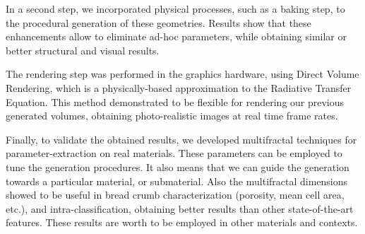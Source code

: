 \documentclass[spanish,a4paper,oneside,10pt,openright]{book}
\begin{document}
In a second step, we incorporated physical processes, such as a baking step, to the procedural generation of these geometries.
Results show that these enhancements allow to eliminate ad-hoc parameters, while obtaining similar or better structural and visual results.

The rendering step was performed in the graphics hardware, using Direct Volume Rendering, which is a physically-based approximation to the Radiative Transfer Equation.
This method demonstrated to be flexible for rendering our previous generated volumes, obtaining photo-realistic images at real time frame rates.

Finally, to validate the obtained results, we developed multifractal techniques for parameter-extraction on real materials.
These parameters can be employed to tune the generation procedures.
It also means that we can guide the generation towards a particular material, or submaterial.
Also the multifractal dimensions showed to be useful in bread crumb characterization (porosity, mean cell area, etc.), and intra-classification, obtaining better results than other state-of-the-art features.
These results are worth to be employed in other materials and contexts.

\phantom{p. 1}
\thispagestyle{empty}

\renewcommand*\glspostdescription{\dotfill}
\setlength{\glslistdottedwidth}{1\textwidth}
\setlength{\glsdescwidth}{0.89\textwidth}
\printglossary[type=\acronymtype,style=long3col, title=Acrónimos]

\phantom{p. 1}
\clearpage

\tableofcontents %

\phantom{p. 1}
\clearpage
\thispagestyle{empty}
\phantom{p. 2}
\clearpage

\cleardoublepage
{} %
\listoffigures %

\phantom{p. 1}
\clearpage
\thispagestyle{empty}
\phantom{p. 1}
\clearpage


\cleardoublepage
{} %
\listoftables %



\newpage


\phantom{p. 1}
\clearpage

 \cleardoublepage
\end{document}
